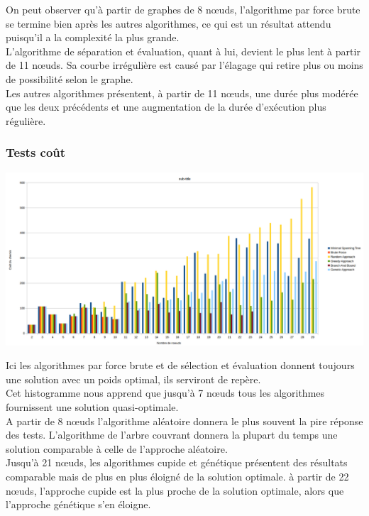 \documentclass[10pt,a4paper]{report}
\begin{document}
			On peut observer qu'à partir de graphes de 8 nœuds, l'algorithme par force brute se termine bien après les autres algorithmes, ce qui est un résultat attendu puisqu'il a la complexité la plus grande.\\
			L'algorithme de séparation et évaluation, quant à lui, devient le plus lent à partir de 11 nœuds. Sa courbe irrégulière est causé par l'élagage qui retire plus ou moins de possibilité selon le graphe.\\
			Les autres algorithmes présentent, à partir de 11 nœuds, une durée plus modérée que les deux précédents et une augmentation de la durée d'exécution plus régulière.
		
		\subsubsection{Tests coût}
			
			\includegraphics[scale=0.40]{./Ressource/cout_graphes_random.png}
			
			Ici les algorithmes par force brute et de sélection et évaluation donnent toujours une solution avec un poids optimal, ils serviront de repère.\\
			Cet histogramme nous apprend que jusqu'à 7 nœuds tous les algorithmes fournissent une solution quasi-optimale.\\
			A partir de 8 nœuds l'algorithme aléatoire donnera le plus souvent la pire réponse des tests. L'algorithme de l'arbre couvrant donnera la plupart du temps une solution comparable à celle de l'approche aléatoire.\\
			Jusqu'à 21 nœuds, les algorithmes cupide et génétique présentent des résultats comparable mais de plus en plus éloigné de la solution optimale. à partir de 22 nœuds, l'approche cupide est la plus proche de la solution optimale, alors que l'approche génétique s'en éloigne.
					
\end{document}
